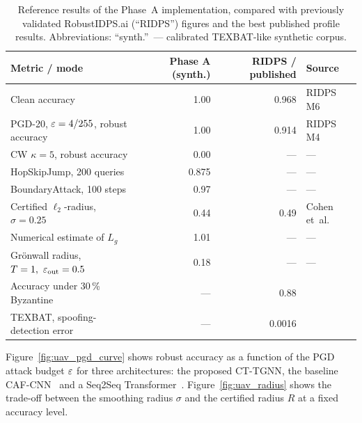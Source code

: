 \begin{table}[H]
\centering
\caption{Reference results of the Phase~A implementation, compared
with previously validated \textsf{RobustIDPS.ai} (``RIDPS'') figures
and the best published profile results. Abbreviations:
``synth.''~--- calibrated TEXBAT-like synthetic corpus.}
\label{tab:uav_phase_a_metrics}
\small
\setlength{\tabcolsep}{4pt}
\renewcommand{\arraystretch}{1.18}
\begin{tabularx}{\linewidth}{@{}Xrrl@{}}
\toprule
\textbf{Metric / mode}
  & \textbf{Phase A (synth.)}
  & \textbf{RIDPS / published}
  & \textbf{Source}\\
\midrule
Clean accuracy                                   & 1.00 & 0.968 & RIDPS \textsf{M6}\\
PGD-20, $\varepsilon=4/255$, robust accuracy            & 1.00 & 0.914 & RIDPS \textsf{M4}\\
CW $\kappa=5$, robust accuracy                   & 0.00 & ---   & ---\\
HopSkipJump, 200 queries                         & 0.875 & ---  & ---\\
BoundaryAttack, 100 steps                        & 0.97 & ---   & ---\\
Certified $\ell_2$-radius, $\sigma=0.25$
                                                 & 0.44 & 0.49 & Cohen et~al.\\
Numerical estimate of $L_g$                      & 1.01 & ---  & ---\\
Grönwall radius, $T=1,\ \varepsilon_{\text{out}}=0.5$
                                                 & 0.18 & ---  & ---\\
Accuracy under 30\,\% Byzantine                  & ---  & 0.88 & \cite{cmbrf_vit_2026_uav}\\
TEXBAT, spoofing-detection error                 & ---  & 0.0016 & \cite{aigner_2025_uav}\\
\bottomrule
\end{tabularx}
\end{table}

Figure~\ref{fig:uav_pgd_curve} shows robust accuracy as a function of
the PGD attack budget $\varepsilon$ for three architectures: the proposed
\textsf{CT-TGNN}, the baseline CAF-CNN~\cite{borhani_2024_uav} and a
Seq2Seq Transformer~\cite{aigner_2025_uav}. Figure~\ref{fig:uav_radius}
shows the trade-off between the smoothing radius $\sigma$ and the
certified radius $R$ at a fixed accuracy level.

